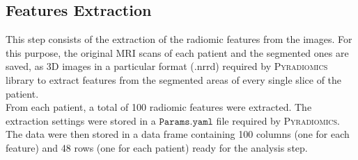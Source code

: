 \documentclass{standalone}
\begin{document}
\subsection{Features Extraction}

This step consists of the extraction of the radiomic features from the images.
For this purpose, the original MRI scans of each patient and the segmented ones are saved, as 3D images in a particular format (.nrrd) required by \textsc{Pyradiomics} library \cite{Pyradiomics} to extract features from the segmented areas of every single slice of the patient. 
\\
From each patient, a total of 100 radiomic features were extracted.
The extraction settings were stored in a $\mathtt{Params.yaml}$ file required by \textsc{Pyradiomics}.
The data were then stored in a data frame containing 100 columns (one for each feature) and 48 rows (one for each patient) ready for the analysis step.
\end{document}
